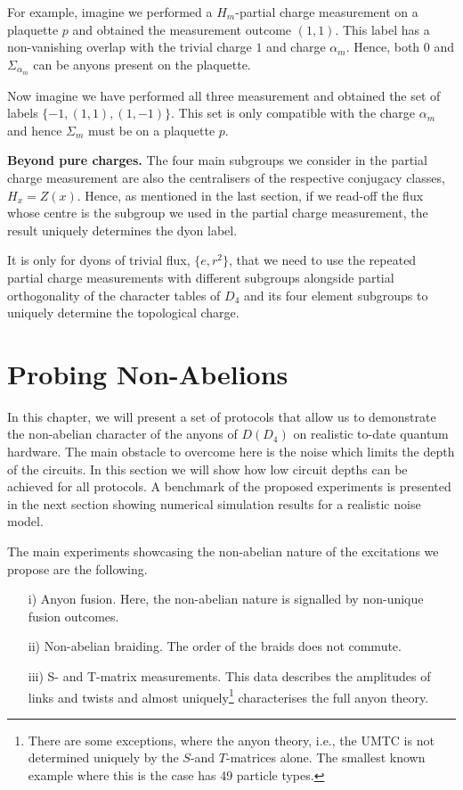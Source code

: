 \documentclass[two column]{article}
\begin{document}
For example, imagine we performed a $H_m$-partial charge measurement on a plaquette $p$ and obtained the measurement outcome $(1,1)$. This label has a non-vanishing overlap with the trivial charge $1$ and charge $\alpha_m$. Hence, both $0$ and $\Sigma_{\alpha_m}$ can be anyons present on the plaquette.

Now imagine we have performed all three measurement and obtained the set of labels $\{-1, (1, 1), (1, -1)\}$. This set is only compatible with the charge $\alpha_m$ and hence $\Sigma_m$ must be on a plaquette $p$.

\textbf{Beyond pure charges.} The four main subgroups we consider in the partial charge measurement are also the centralisers of the respective conjugacy classes, $H_x = Z(x)$. Hence, as mentioned in the last section, if we read-off the flux whose centre is the subgroup we used in the partial charge measurement, the result uniquely determines the dyon label.

It is only for dyons of trivial flux, $\{e, r^2\}$, that we need to use the repeated partial charge measurements with different subgroups alongside partial orthogonality of the character tables of $D_4$ and its four element subgroups to uniquely determine the topological charge.

\section{Probing Non-Abelions} \label{sec:probing}

In this chapter, we will present a set of protocols that allow us to demonstrate the non-abelian character of the anyons of $D(D_4)$ on realistic to-date quantum hardware. The main obstacle to overcome here is the noise which limits the depth of the circuits. In this section we will show how low circuit depths can be achieved for all protocols. A benchmark of the proposed experiments is presented in the next section showing numerical simulation results for a realistic noise model.


The main experiments showcasing the non-abelian nature of the excitations we propose are the following.
\begin{itemize}

\item[i)] Anyon fusion. Here, the non-abelian nature is signalled by non-unique fusion outcomes.

\item[ii)] Non-abelian braiding. The order of the braids does not commute.

\item[iii)] S- and T-matrix measurements. This data describes the amplitudes of links and twists and almost uniquely\footnote{There are some exceptions, where the anyon theory, i.e., the UMTC is not determined uniquely by the $S$-and $T$-matrices alone\cite{notdetermined2021}. The smallest known example where this is the case has 49 particle types.} characterises the full anyon theory.
\end{itemize}
\end{document}
